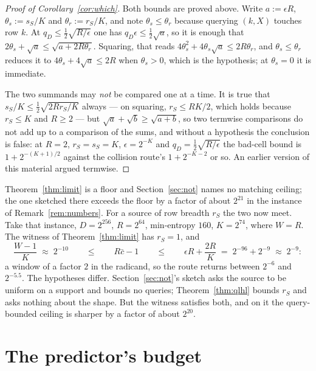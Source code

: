 \documentclass{aicr-solution}
\begin{document}
\begin{proof}[Proof of Corollary~\ref{cor:which}]
Both bounds are proved above. Write $a := \epsilon R$, $\theta_s := s_S/K$ and
$\theta_r := r_S/K$, and note $\theta_s \le \theta_r$ because querying $(k,X)$ touches row $k$. At
$q_D \le \tfrac12\sqrt{R/\epsilon}$ one has $q_D\epsilon \le \tfrac12\sqrt a$, so it is enough that
$2\theta_s + \sqrt a \le \sqrt{a + 2R\theta_r}$. Squaring, that reads
$4\theta_s^{2} + 4\theta_s\sqrt a \le 2R\theta_r$, and $\theta_s \le \theta_r$ reduces it to
$4\theta_s + 4\sqrt a \le 2R$ when $\theta_s > 0$, which is the hypothesis; at $\theta_s = 0$ it is
immediate.

The two summands may \emph{not} be compared one at a time. It is true that
$s_S/K \le \tfrac12\sqrt{2Rr_S/K}$ always --- on squaring, $r_S \le RK/2$, which holds because
$r_S \le K$ and $R \ge 2$ --- but $\sqrt a + \sqrt b \ge \sqrt{a+b}$, so two termwise comparisons
do not add up to a comparison of the sums, and without a hypothesis the conclusion is false: at
$R = 2$, $r_S = s_S = K$, $\epsilon = 2^{-K}$ and $q_D = \tfrac12\sqrt{R/\epsilon}$ the bad-cell
bound is $1 + 2^{-(K+1)/2}$ against the collision route's $1 + 2^{-K-2}$ or so. An earlier version
of this material argued termwise.
\end{proof}

\begin{remark}%
\label{rem:window}
Theorem~\ref{thm:limit} is a floor and Section~\ref{sec:not} names no matching ceiling; the one
sketched there exceeds the floor by a factor of about $2^{21}$ in the instance of
Remark~\ref{rem:numbers}. For a source of row breadth $r_S$ the two now meet. Take that instance,
$D = 2^{256}$, $R = 2^{64}$, min-entropy $160$, $K = 2^{74}$, where $W = R$. The witness of
Theorem~\ref{thm:limit} has $r_S = 1$, and
\[
  \frac{W-1}{K} \;\approx\; 2^{-10}
  \qquad\le\qquad R\bar c - 1 \qquad\le\qquad
  \epsilon R + \frac{2R}{K} \;=\; 2^{-96} + 2^{-9} \;\approx\; 2^{-9} :
\]
a window of a factor $2$ in the radicand, so the route returns between $2^{-6}$ and $2^{-5.5}$. The
hypotheses differ. Section~\ref{sec:not}'s sketch asks the source to be uniform on a support and
bounds no queries; Theorem~\ref{thm:qlhl} bounds $r_S$ and asks nothing about the shape. But the
witness satisfies both, and on it the query-bounded ceiling is sharper by a factor of about
$2^{20}$.
\end{remark}

\section{The predictor's budget}\label{sec:predictor}
\end{document}
